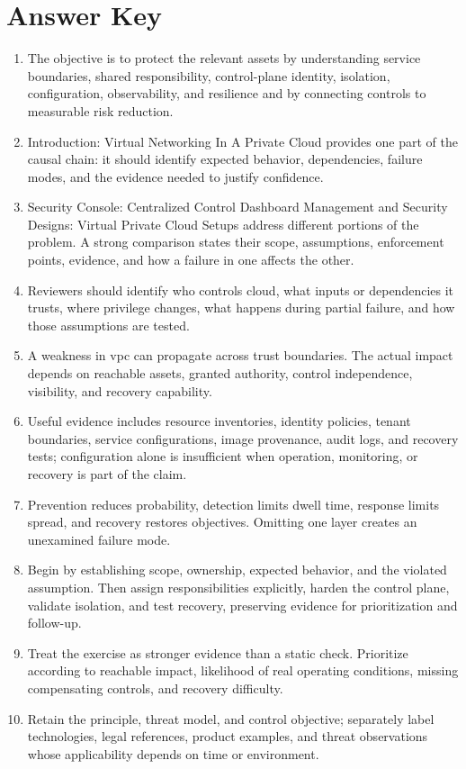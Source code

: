 \documentclass[11pt]{article}
\begin{document}
\section*{Answer Key}
\begin{enumerate}
\item The objective is to protect the relevant assets by understanding service boundaries, shared responsibility, control-plane identity, isolation, configuration, observability, and resilience and by connecting controls to measurable risk reduction.
\item Introduction: Virtual Networking In A Private Cloud provides one part of the causal chain: it should identify expected behavior, dependencies, failure modes, and the evidence needed to justify confidence.
\item Security Console: Centralized Control Dashboard Management and Security Designs: Virtual Private Cloud Setups address different portions of the problem. A strong comparison states their scope, assumptions, enforcement points, evidence, and how a failure in one affects the other.
\item Reviewers should identify who controls cloud, what inputs or dependencies it trusts, where privilege changes, what happens during partial failure, and how those assumptions are tested.
\item A weakness in vpc can propagate across trust boundaries. The actual impact depends on reachable assets, granted authority, control independence, visibility, and recovery capability.
\item Useful evidence includes resource inventories, identity policies, tenant boundaries, service configurations, image provenance, audit logs, and recovery tests; configuration alone is insufficient when operation, monitoring, or recovery is part of the claim.
\item Prevention reduces probability, detection limits dwell time, response limits spread, and recovery restores objectives. Omitting one layer creates an unexamined failure mode.
\item Begin by establishing scope, ownership, expected behavior, and the violated assumption. Then assign responsibilities explicitly, harden the control plane, validate isolation, and test recovery, preserving evidence for prioritization and follow-up.
\item Treat the exercise as stronger evidence than a static check. Prioritize according to reachable impact, likelihood of real operating conditions, missing compensating controls, and recovery difficulty.
\item Retain the principle, threat model, and control objective; separately label technologies, legal references, product examples, and threat observations whose applicability depends on time or environment.
\end{enumerate}
\end{document}

